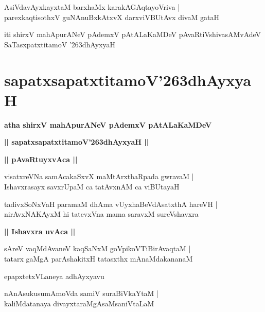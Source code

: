 \documentclass[twoside,12pt,openright]{book}
\def\S{\char'263}
\newcounter{shloka}[chapter]
\def\uvaca#1{\centerline{{\large\textbf{#1}}}}
\begin{document}
\begin{shloka}%
AsiVdavAyxkayxtaM barxhaMx karakAGAqtayoVriva |\\
parexkaqtisothxV guNAnuBxkAtxvX darxviVBUtAvx divaM gataH 
\end{shloka}

\begin{center}
iti shirxV mahApurANeV pAdemxV pAtALaKaMDeV pAvaRtiVshivasAMvAdeV  
SaTasxpatxtitamoV \S dhAyxyaH
\end{center}

\chapter{sapatxsapatxtitamoV\S dhAyxyaH}

\begin{center}
{\LARGE\bfseries atha shirxV mahApurANeV pAdemxV pAtALaKaMDeV }
\end{center}

\begin{center}         
{\LARGE\bfseries || sapatxsapatxtitamoV\S dhAyxyaH ||}
\end{center}

\uvaca{|| pAvaRtuyxvAca ||}

\begin{shloka}%
visatxreVNa samAcakaSxvX maMtArxthaRpada gwravaM |\\
Ishavxrasayx savxrUpaM ca tatAvxnAM ca viBUtayaH 
\end{shloka}

\begin{shloka}%
tadivxSoNxVaH paramaM dhAma vUyxhaBeVdAsatxthA hareVH |\\
nirAvxNAKAyxM hi tatevxVna mama saravxM sureVshavxra
\end{shloka}

\uvaca{|| Ishavxra uvAca ||}

\begin{shloka}%
sAreV vaqMdAvaneV kaqSaNxM goVpikoVTiBirAvaqtaM |\\
tatarx gaMgA parAshakitxH tatasxthx mAnaMdakananaM 
\end{shloka}

\begin{center}
epapxtetxVLaneya adhAyxyavu
\end{center}

\begin{shloka}%
nAnAsukusumAmoVda samiV suraBiVkaYtaM |\\
kaliMdatanaya divayxtaraMgAsaMsaniVtaLaM
\end{shloka}
\end{document}
